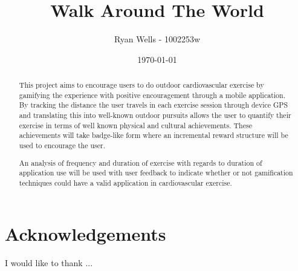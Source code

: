 \documentclass{l4proj}
\begin{document}
\newcommand{\todo}[1]{\textcolor{red}{#1}}
	
	
\title{Walk Around The World}
\author{Ryan Wells - 1002253w}
\date{\today}
\maketitle
\begin{abstract}

This project aims to encourage users to do outdoor cardiovascular
exercise by gamifying the experience with positive encouragement
through a mobile application. By tracking the distance the user
travels in each exercise session through device GPS and translating
this into well-known outdoor pursuits allows the user to quantify
their exercise in terms of well known physical and cultural
achievements. These achievements will take badge-like form where an
incremental reward structure will be used to encourage the user. 




An analysis of frequency and duration of exercise with regards to
duration of application use will be used with user feedback to
indicate whether or not gamification techniques could have a valid
application in cardiovascular exercise.  

\end{abstract}
\educationalconsent
\tableofcontents
\pagebreak
{}






\section{Acknowledgements}
I would like to thank ...



\appendix




\end{document}
